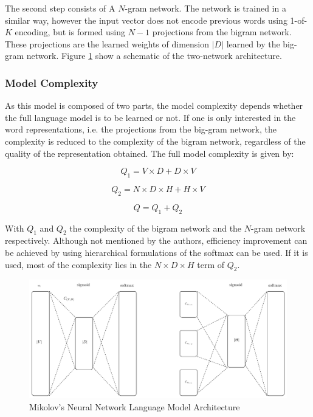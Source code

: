 The second step consists of  A $N$-gram network. The network is trained in a
similar way, however the input vector does not encode previous words using 1-of-$K$ encoding, but is formed using $N-1$ projections from
the  bigram network. These projections are the learned weights of dimension
$|D|$ learned by the big-gram network. Figure
\ref{fig:mikolov_nnlm_architecture} show a schematic of the two-network architecture.


\subsubsection{Model Complexity}

As this model is composed of two parts, the model complexity depends whether
the full language model is to be learned or not. If one is only interested in
the word representations, i.e. the projections from the big-gram network,  the
complexity is reduced to the complexity of the bigram network, regardless of
the quality of the representation obtained.  The full model
complexity is given by: 


\begin{equation} Q_1 = V \times D + D \times V  \end{equation}

\begin{equation} Q_2 =  N \times D \times H + H \times V   \end{equation}

\begin{equation} Q = Q_1 + Q_2
\end{equation}

With $Q_1$ and $Q_2$ the complexity of the bigram network and the $N$-gram
network respectively. Although not mentioned by the authors, efficiency
improvement can be achieved by using hierarchical formulations of the softmax
can be used. If it is used, most of the complexity  lies in the  $N \times D \times
H$ term of $Q_2$.

\begin{figure}[hptb!]
    \centering
    \includegraphics[width=1.0\textwidth]{images/mikolov-fnnl-latex.pdf} 
    \caption{Mikolov's Neural Network Language Model Architecture}
    \label{fig:mikolov_nnlm_architecture}
\end{figure}
  

